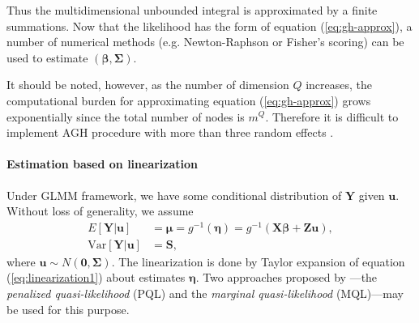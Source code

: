 Thus the multidimensional unbounded integral is approximated by a finite summations. Now that the
likelihood has the form of equation (\ref{eq:gh-approx}), a number of numerical methods (e.g. 
Newton-Raphson
or Fisher's scoring) can be used to estimate $(\bm \beta,  \bm \Sigma)$. 

It should be noted, however, as the number of dimension $Q$ increases, the computational burden for
approximating equation (\ref{eq:gh-approx}) grows exponentially since the total number of nodes is 
$m^Q$. 
Therefore it is difficult to implement AGH procedure with more than three random effects
\citep{bolker2009generalized}.


\paragraph{Estimation based on linearization}\label{para:linearization}



Under GLMM framework, we have some conditional distribution of $\bm Y$ given $\bm u$. Without loss
of generality, we assume
\begin{equation}\label{eq:linearization1}
	\begin{aligned}
		E[\bm Y|\bm u] &= \bm \mu = g^{-1}(\bm \eta) = g^{-1}(\bm{X\beta} + \bm {Zu}), \\
		\text{Var}[\bm Y|\bm u]  & = \bm S,
	\end{aligned}
\end{equation}
where $\bm u \sim N(\bm 0, \bm \Sigma)$.  The linearization is done by Taylor expansion of equation
(\ref{eq:linearization1}) about estimates $\bm \eta$. Two approaches proposed by \citet{breslow1993approximate}---the
\textit{penalized quasi-likelihood } (PQL) and the \textit{marginal quasi-likelihood} (MQL)---may be used
for this purpose. 


